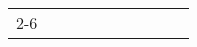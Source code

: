


\renewcommand{\arraystretch}{1.5}%
\begin{tabular}{c|m{6cm}|cm{0.75cm}|cm{0.75cm}|cm{0.75cm}|cm{0.75cm}|}
\cline{2-6}


\end{tabular}
